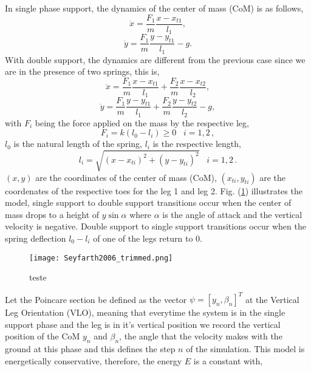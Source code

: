 \noindent In single phase support, the dynamics of the center of mass (CoM) is as follows,
\begin{equation}
  \ddot{x}=\frac{F_1}{m}\frac{x-x_{t1}}{l_1},
  \end{equation}
\begin{equation}
  \ddot{y}=\frac{F_1}{m}\frac{y-y_{t1}}{l_1}-g.
\end{equation}
\noindent With double support, the dynamics are different from the previous case since we are in the presence of two springs, this is,
\begin{equation}
 \ddot{x}=\frac{F_1}{m}\frac{x-x_{t1}}{l_1}+\frac{F_2}{m}\frac{x-x_{t2}}{l_2},
  \end{equation}
\begin{equation}
  \ddot{y}=\frac{F_1}{m}\frac{y-y_{t1}}{l_1}+\frac{F_2}{m}\frac{y-y_{t2}}{l_2}-g,
\end{equation}
with $F_i$ being the force applied on the mass by the respective leg,
\begin{equation}
  F_i=k(l_0-l_i)\geq 0 \,\,\,\,\, i=1,2\,,
\end{equation}
$l_0$ is the natural length of the spring, $l_i$ is the respective length,
\begin{equation}
l_i=\sqrt{(x-x_{ti})^2+(y-y_{ti})^2} \,\,\,\,\, i =1,2 \,.
\end{equation}
 $(x,y)$ are the coordinates of the center of mass (CoM), $(x_{ti},y_{ti})$ are the coordenates of the respective toes for the leg 1 and leg 2.
\noindent  Fig. (\ref{Seyfarthmodel}) illustrates the model, single support to double support transitions occur when the center of mass drops to a height of $y \sin{\alpha}$ where $\alpha$ is the angle of attack and the vertical velocity is negative. Double support to single support transitions occur when the spring deflection $l_0 - l_i$ of one of the legs return to 0.

\begin{figure}[H]
\centering
\texttt{[image: Seyfarth2006\_trimmed.png]}
\caption{teste}
\label{Seyfarthmodel}
\end{figure}

Let the Poincare section be defined as the vector $\psi=[y_n,\beta_n]^T$ at the Vertical Leg Orientation (VLO), meaning that everytime the system is in the single support phase and the leg is in it's vertical position we record the vertical position of the CoM $y_n$ and $\beta_n$, the angle that the velocity makes with the ground at this phase and  this defines the step $n$ of the simulation.
\noindent This model is energetically conservative, therefore, the energy $E$ is a constant with,

